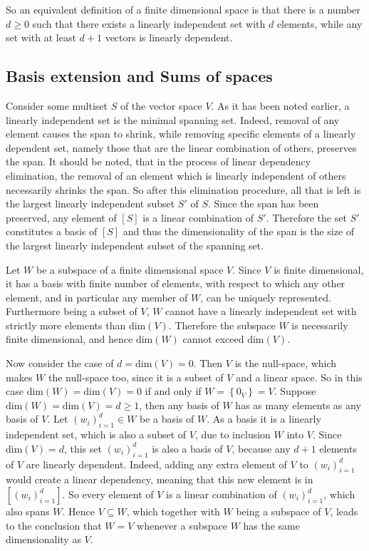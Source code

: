 \documentclass[a4paper]{article}
\newcommand{\obj}[1]{\ensuremath{\left\{ #1 \right\}}}
\newcommand{\brac}[1]{\ensuremath{\left( #1 \right)}}
\newcommand{\spn}[1]{\ensuremath{\left[ #1 \right]}}
\newcommand{\Dim}[1]{\ensuremath{\text{dim}\brac{ #1 }}}
\begin{document}
So an equivalent definition of a finite dimensional space is that there is a number $d\geq 0$ such that there exists a linearly independent set with $d$ elements, while any set with at least $d+1$ vectors is linearly dependent.



\subsection{Basis extension and Sums of spaces} %
\label{sub:basis_extension_and_sums_of_spaces}

Consider some multiset $S$ of the vector space $V$. As it has been noted earlier, a linearly independent set is the minimal spanning set. Indeed, removal of any element causes the span to shrink, while removing specific elements of a linearly dependent set, namely those that are the linear combination of others, preserves the span. It should be noted, that in the process of linear dependency elimination, the removal of an element which is linearly independent of others necessarily shrinks the span. So after this elimination procedure, all that is left is the largest linearly independent subset $S'$ of $S$. Since the span has been preserved, any element of $\spn{S}$ is a linear combination of $S'$. Therefore the set $S'$ constitutes a basis of $\spn{S}$ and thus the dimensionality of the span is the size of the largest linearly independent subset of the spanning set.

Let $W$ be a subspace of a finite dimensional space $V$. Since $V$ is finite dimensional, it has a basis with finite number of elements, with respect to which any other element, and in particular any member of $W$, can be uniquely represented. Furthermore being a subset of $V$, $W$ cannot have a linearly independent set with strictly more elements than $\Dim{V}$. Therefore the subspace $W$ is necessarily finite dimensional, and hence $\Dim{W}$ cannot exceed $\Dim{V}$.

Now consider the case of $d = \Dim{V} = 0$. Then $V$ is the null-space, which makes $W$ the null-space too, since it is a subset of $V$ and a linear space. So in this case $\Dim{W} = \Dim{V} = 0$ if and only if $W = \obj{0_V} = V$. Suppose $\Dim{W} = \Dim{V} = d \geq 1$, then any basis of $W$ has as many elements as any basis of $V$. Let $\brac{w_i}_{i=1}^d\in W$ be a basis of $W$. As a basis it is a linearly independent set, which is also a subset of $V$, due to inclusion $W$ into $V$. Since $\Dim{V} = d$, this set $\brac{w_i}_{i=1}^d$ is also a basis of $V$, because any $d+1$ elements of $V$ are linearly dependent. Indeed, adding any extra element of $V$ to $\brac{w_i}_{i=1}^d$ would create a linear dependency, meaning that this new element is in $\spn{\brac{w_i}_{i=1}^d}$. So every element of $V$ is a linear combination of $\brac{w_i}_{i=1}^d$, which also spans $W$. Hence $V\subseteq W$, which together with $W$ being a subspace of $V$, leads to the conclusion that $W=V$ whenever a subspace $W$ has the same dimensionality as $V$.
\end{document}
